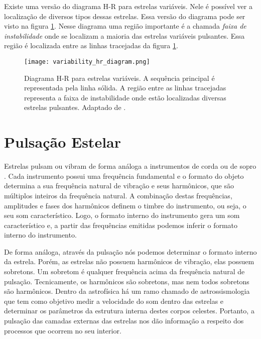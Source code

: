 Existe uma versão do diagrama H-R para estrelas variáveis. Nele é possível ver a localização de diversos tipos dessas estrelas. Essa versão do diagrama pode ser visto na figura \ref{fig:hr_variavel}. Nesse diagrama uma região importante é a chamada \textit{faixa de instabilidade} onde se localizam a maioria das estrelas variáveis pulsantes. Essa região é localizada entre as linhas tracejadas da figura \ref{fig:hr_variavel}.

\begin{figure}[ht!]
\centering
\texttt{[image: variability\_hr\_diagram.png]}
\caption[Diagrama H-R para estrelas variáveis.]{Diagrama H-R para estrelas variáveis. A sequência principal é representada pela linha sólida. A região entre as linhas tracejadas representa a faixa de instabilidade onde estão localizadas diversas estrelas pulsantes. Adaptado de \citet{Catelan_book}.}
\label{fig:hr_variavel}
\end{figure}

\section{Pulsação Estelar}


Estrelas pulsam ou vibram de forma análoga a instrumentos de corda ou de sopro \citep{astroseis}. Cada instrumento possui uma frequência fundamental e o formato do objeto determina a sua frequência natural de vibração e seus harmônicos, que são múltiplos inteiros da frequência natural. A combinação destas frequências, amplitudes e fases dos harmônicos definem o timbre do instrumento, ou seja, o seu som característico. Logo, o formato interno do instrumento gera um som característico e, a partir das frequências emitidas podemos inferir o formato interno do instrumento.

De forma análoga, através da pulsação nós podemos determinar o formato interno da estrela. Porém, as estrelas não possuem harmônicos de vibração, elas possuem sobretons. Um sobretom é qualquer frequência acima da frequência natural de pulsação. Tecnicamente, os harmônicos são sobretons, mas nem todos sobretons são harmônicos. Dentro da astrofísica há um ramo chamado de astrossismologia que tem como objetivo medir a velocidade do som dentro das estrelas e determinar os parâmetros da estrutura interna destes corpos celestes. Portanto, a pulsação das camadas externas das estrelas nos dão informação a respeito dos processos que ocorrem no seu interior.

